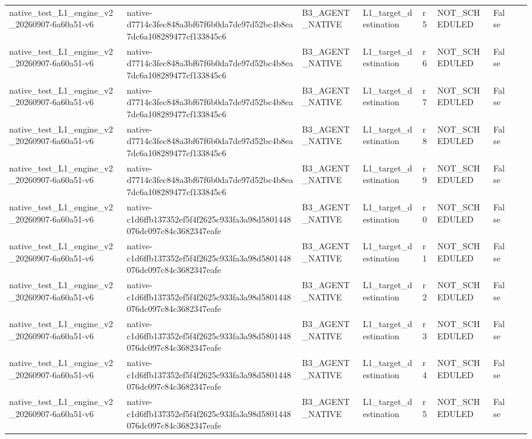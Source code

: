 \begin{tabular}{lllllllll}
native\_test\_L1\_engine\_v2\_20260907-6a60a51-v6 & native-d7714c3fec848a3bf67f6b0da7de97d52bc4b8ea7dc6a108289477cf133845c6 & B3\_AGENT\_NATIVE & L1\_target\_destination & r5 & NOT\_SCHEDULED & False &  &  \\
native\_test\_L1\_engine\_v2\_20260907-6a60a51-v6 & native-d7714c3fec848a3bf67f6b0da7de97d52bc4b8ea7dc6a108289477cf133845c6 & B3\_AGENT\_NATIVE & L1\_target\_destination & r6 & NOT\_SCHEDULED & False &  &  \\
native\_test\_L1\_engine\_v2\_20260907-6a60a51-v6 & native-d7714c3fec848a3bf67f6b0da7de97d52bc4b8ea7dc6a108289477cf133845c6 & B3\_AGENT\_NATIVE & L1\_target\_destination & r7 & NOT\_SCHEDULED & False &  &  \\
native\_test\_L1\_engine\_v2\_20260907-6a60a51-v6 & native-d7714c3fec848a3bf67f6b0da7de97d52bc4b8ea7dc6a108289477cf133845c6 & B3\_AGENT\_NATIVE & L1\_target\_destination & r8 & NOT\_SCHEDULED & False &  &  \\
native\_test\_L1\_engine\_v2\_20260907-6a60a51-v6 & native-d7714c3fec848a3bf67f6b0da7de97d52bc4b8ea7dc6a108289477cf133845c6 & B3\_AGENT\_NATIVE & L1\_target\_destination & r9 & NOT\_SCHEDULED & False &  &  \\
native\_test\_L1\_engine\_v2\_20260907-6a60a51-v6 & native-c1d6ffb137352ef5f4f2625c933fa3a98d5801448076dc097c84c3682347eafe & B3\_AGENT\_NATIVE & L1\_target\_destination & r0 & NOT\_SCHEDULED & False &  &  \\
native\_test\_L1\_engine\_v2\_20260907-6a60a51-v6 & native-c1d6ffb137352ef5f4f2625c933fa3a98d5801448076dc097c84c3682347eafe & B3\_AGENT\_NATIVE & L1\_target\_destination & r1 & NOT\_SCHEDULED & False &  &  \\
native\_test\_L1\_engine\_v2\_20260907-6a60a51-v6 & native-c1d6ffb137352ef5f4f2625c933fa3a98d5801448076dc097c84c3682347eafe & B3\_AGENT\_NATIVE & L1\_target\_destination & r2 & NOT\_SCHEDULED & False &  &  \\
native\_test\_L1\_engine\_v2\_20260907-6a60a51-v6 & native-c1d6ffb137352ef5f4f2625c933fa3a98d5801448076dc097c84c3682347eafe & B3\_AGENT\_NATIVE & L1\_target\_destination & r3 & NOT\_SCHEDULED & False &  &  \\
native\_test\_L1\_engine\_v2\_20260907-6a60a51-v6 & native-c1d6ffb137352ef5f4f2625c933fa3a98d5801448076dc097c84c3682347eafe & B3\_AGENT\_NATIVE & L1\_target\_destination & r4 & NOT\_SCHEDULED & False &  &  \\
native\_test\_L1\_engine\_v2\_20260907-6a60a51-v6 & native-c1d6ffb137352ef5f4f2625c933fa3a98d5801448076dc097c84c3682347eafe & B3\_AGENT\_NATIVE & L1\_target\_destination & r5 & NOT\_SCHEDULED & False &  &  \\

\end{tabular}
